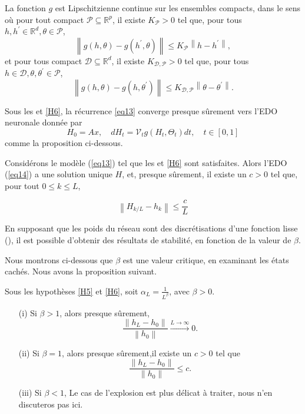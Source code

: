 \begin{assumption}\label{H6}
La fonction $g$ est Lipschitzienne continue sur les ensembles compacts, dans le sens où pour tout compact $\mathscr{P} \subseteq \mathbb{R}^p$, il existe $K_{\mathscr{P}} > 0$  tel que, pour tous $h, h^{\prime} \in \mathbb{R}^d, \theta \in \mathscr{P}$,
$$
\left\|g(h, \theta)-g\left(h^{\prime}, \theta\right)\right\| \leqslant K_{\mathscr{P}}\left\|h-h^{\prime}\right\|,
$$
et pour tous compact $\mathscr{D} \subseteq \mathbb{R}^d$, il existe $K_{\mathscr{D}, \mathscr{P}}>0$ tel que, pour tous $h \in \mathscr{D}, \theta, \theta^{\prime} \in \mathscr{P}$,
$$
\left\|g(h, \theta)-g\left(h, \theta^{\prime}\right)\right\| \leqslant K_{\mathscr{D}, \mathscr{P}}\left\|\theta-\theta^{\prime}\right\| .
$$
\end{assumption}


Sous les  et \ref{H6}, la récurrence \ref{eq13} converge presque sûrement vers l'EDO neuronale donnée par
\begin{equation}\label{eq14}
H_0=A x, \quad d H_t=\mathscr{V}_t g\left(H_t, \Theta_t\right) d t, \quad t \in[0,1]
\end{equation}
comme la proposition ci-dessous.

\begin{proposition}\label{prop11}
Considérons le modèle (\ref{eq13}) tel que les  et \ref{H6} sont satisfaites. Alors l'EDO (\ref{eq14}) a une solution unique $H$, et, presque sûrement, il existe un $c > 0$
tel que, pour tout $0 \leqslant k \leqslant L$,

\begin{equation}  
\left\|H_{k / L}-h_k\right\| \leqslant \frac{c}{L}
\end{equation}
\end{proposition}

En supposant que les poids du réseau sont des discrétisations d'une fonction lisse (), il est possible d'obtenir des résultats de stabilité, en fonction de la valeur de $\beta$.

Nous montrons ci-dessous que $\beta$ est une valeur critique, en examinant les états cachés. Nous avons la proposition suivant.

\begin{proposition}\label{prop12}
    Sous les hypothèses \ref{H5} et \ref{H6}, soit $\alpha_L = \frac{1}{L^{\beta}}$, avec $\beta >0 $.
    \begin{itemize}
        \item [(i)] Si $\beta > 1 $, alors presque sûrement, 
            \[
                \frac{\left\| h_L - h_0 \right\| }{\left\| h_0 \right\| } \xrightarrow{L \to \infty } 0 
            .\]
        \item [(ii)] Si $\beta = 1 $, alors presque sûrement,il existe un $c > 0$ tel que
            \[
                \frac{\left\| h_L - h_0 \right\| }{\left\| h_0 \right\| } \leqslant c
            .\]
        \item [(iii)] Si $\beta < 1 $, Le cas de l'explosion est plus délicat à traiter, nous n'en discuteros pas ici.
    \end{itemize}
\end{proposition}

